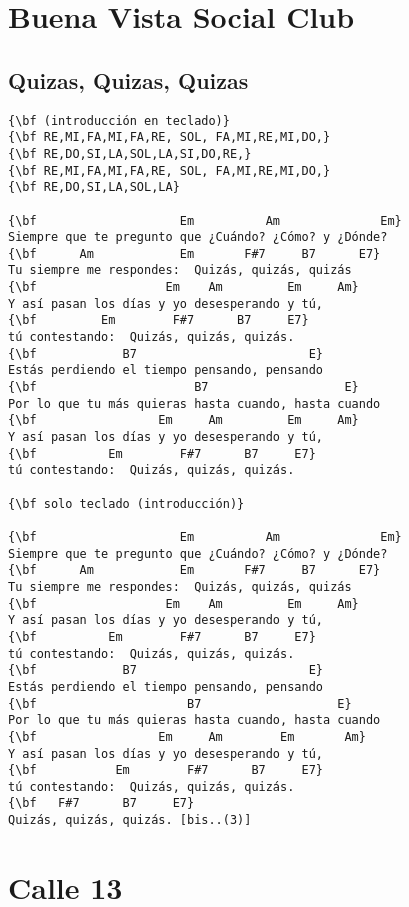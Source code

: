 \documentclass[a4paper]{article}
\begin{document}
\section{Buena Vista Social Club}
\subsection{Quizas, Quizas, Quizas}
\begin{Verbatim}[commandchars=\\\{\}]
{\bf (introducción en teclado)}
{\bf RE,MI,FA,MI,FA,RE, SOL, FA,MI,RE,MI,DO,}
{\bf RE,DO,SI,LA,SOL,LA,SI,DO,RE,}
{\bf RE,MI,FA,MI,FA,RE, SOL, FA,MI,RE,MI,DO,}
{\bf RE,DO,SI,LA,SOL,LA}

{\bf                    Em          Am              Em}
Siempre que te pregunto que ¿Cuándo? ¿Cómo? y ¿Dónde?
{\bf      Am            Em       F#7     B7      E7}
Tu siempre me respondes:  Quizás, quizás, quizás
{\bf                  Em    Am         Em     Am}
Y así pasan los días y yo desesperando y tú,
{\bf         Em        F#7      B7     E7}
tú contestando:  Quizás, quizás, quizás.
{\bf            B7                        E}
Estás perdiendo el tiempo pensando, pensando
{\bf                      B7                   E}
Por lo que tu más quieras hasta cuando, hasta cuando
{\bf                 Em     Am         Em     Am}
Y así pasan los días y yo desesperando y tú,
{\bf          Em        F#7      B7     E7}
tú contestando:  Quizás, quizás, quizás.

{\bf solo teclado (introducción)}

{\bf                    Em          Am              Em}
Siempre que te pregunto que ¿Cuándo? ¿Cómo? y ¿Dónde?
{\bf      Am            Em       F#7     B7      E7}
Tu siempre me respondes:  Quizás, quizás, quizás
{\bf                  Em    Am         Em     Am}
Y así pasan los días y yo desesperando y tú,
{\bf          Em        F#7      B7     E7}
tú contestando:  Quizás, quizás, quizás.
{\bf            B7                        E}
Estás perdiendo el tiempo pensando, pensando
{\bf                     B7                   E}
Por lo que tu más quieras hasta cuando, hasta cuando
{\bf                 Em     Am        Em       Am}
Y así pasan los días y yo desesperando y tú,
{\bf           Em        F#7      B7     E7}
tú contestando:  Quizás, quizás, quizás.
{\bf   F#7      B7     E7}
Quizás, quizás, quizás. [bis..(3)]

\end{Verbatim}
\newpage
\section{Calle 13}
\end{document}
